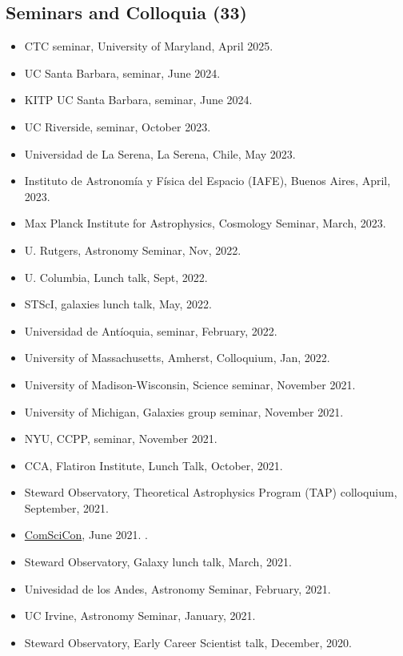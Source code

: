 \documentclass[14pt]{article}
\begin{document}
\subsection*{Seminars and Colloquia (33)}
\begin{itemize}
  \setlength\itemsep{0.0em}
  \renewcommand\labelitemi{$\cdot$}

\item CTC seminar, University of Maryland, April 2025.\dag 
\item UC Santa Barbara, seminar, June 2024. \dag
\item KITP UC Santa Barbara, seminar, June 2024. \dag
\item UC Riverside, seminar, October 2023. \dag
\item Universidad de La Serena, La Serena, Chile, May 2023. \dag 
\item Instituto de Astronom\'ia y F\'isica del Espacio (IAFE), Buenos Aires, April, 2023.
\item Max Planck Institute for Astrophysics, Cosmology Seminar, March, 2023.
\item U. Rutgers, Astronomy Seminar, Nov, 2022. \dag
\item U. Columbia, Lunch talk, Sept, 2022. \dag
\item STScI, galaxies lunch talk, May, 2022. \dag
\item Universidad de Ant\'ioquia, seminar, February, 2022. \dag 
\item University of Massachusetts, Amherst, Colloquium, Jan, 2022. \dag
\item University of Madison-Wisconsin, Science seminar, November 2021.\dag
\item University of Michigan, Galaxies group seminar, November 2021.\dag
\item NYU, CCPP, seminar, November 2021.\dag 
\item CCA, Flatiron Institute, Lunch Talk, October, 2021.
\item Steward Observatory, Theoretical Astrophysics Program (TAP) colloquium, September, 2021.\dag
\item \href{https://comscicon.com/comscicon-en-espa%C3%B1ol-2021}{ComSciCon},
    June 2021. \dag. 
\item Steward Observatory, Galaxy lunch talk, March, 2021.
\item Univesidad de los Andes, Astronomy Seminar, February, 2021. 
\item UC Irvine, Astronomy Seminar, January, 2021. \dag
\item Steward Observatory, Early Career Scientist talk, December, 2020. \dag

\end{itemize}
\end{document}

